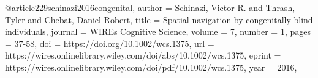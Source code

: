 @article{229schinazi2016congenital,
author = {Schinazi, Victor R. and Thrash, Tyler and Chebat, Daniel-Robert},
title = {Spatial navigation by congenitally blind individuals},
journal = {WIREs Cognitive Science},
volume = {7},
number = {1},
pages = {37-58},
doi = {https://doi.org/10.1002/wcs.1375},
url = {https://wires.onlinelibrary.wiley.com/doi/abs/10.1002/wcs.1375},
eprint = {https://wires.onlinelibrary.wiley.com/doi/pdf/10.1002/wcs.1375},
year = {2016},
}